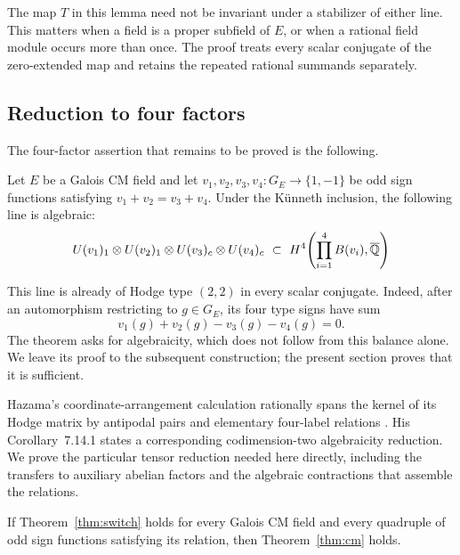 The map \(T\) in this lemma need not be invariant under a stabilizer
of either line.  This matters when a field is a proper subfield of
\(E\), or when a rational field module occurs more than once.  The
proof treats every scalar conjugate of the zero-extended map and
retains the repeated rational summands separately.

\subsection{Reduction to four factors}

The four-factor assertion that remains to be proved is the following.

\begin{theorem}\label{thm:switch}
Let \(E\) be a Galois CM field and let
\(v_1,v_2,v_3,v_4:G_E\to\{1,-1\}\) be odd sign functions satisfying
\(v_1+v_2=v_3+v_4\).  Under the Künneth inclusion, the following line is algebraic:
\begin{equation}\label{eq:switch-line}
 U(v_1)_1\otimes U(v_2)_1\otimes U(v_3)_c\otimes U(v_4)_c
 \ \subset\
 H^4\!\left(\prod_{i=1}^4B(v_i),\overline{\mathbb{Q}}\right)
\end{equation}
\end{theorem}

This line is already of Hodge type \((2,2)\) in every scalar
conjugate.  Indeed, after an automorphism restricting to \(g\in G_E\),
its four type signs have sum
\begin{equation}\label{eq:switch-conjugate-balance}
 v_1(g)+v_2(g)-v_3(g)-v_4(g)=0.
\end{equation}
The theorem asks for algebraicity, which does not follow from this
balance alone.  We leave its proof to the subsequent construction;
the present section proves that it is sufficient.

Hazama's coordinate-arrangement calculation rationally spans the
kernel of its Hodge matrix by antipodal pairs and elementary
four-label relations \cite[Theorem~7.13]{Hazama2003CM}.  His
Corollary~7.14.1 states a corresponding codimension-two algebraicity
reduction.  We prove the particular tensor reduction needed here
directly, including the transfers to auxiliary abelian factors and
the algebraic contractions that assemble the relations.

\begin{proposition}\label{prop:switch-reduction}
If Theorem~\ref{thm:switch} holds for every Galois CM field and every
quadruple of odd sign functions satisfying its relation, then
Theorem~\ref{thm:cm} holds.
\end{proposition}

